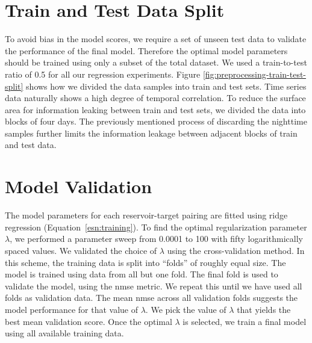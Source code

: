 \section{Train and Test Data Split} \label{sec:train-test-split}

To avoid bias in the model scores, we require a set of unseen test data to validate the performance of the final model.
Therefore the optimal model parameters should be trained using only a subset of the total dataset.
We used a train-to-test ratio of 0.5 for all our regression experiments.
Figure \ref{fig:preprocessing-train-test-split} shows how we divided the data samples into train and test sets.
Time series data naturally shows a high degree of temporal correlation.
To reduce the surface area for information leaking between train and test sets, we divided the data into blocks of four days.
The previously mentioned process of discarding the nighttime samples further limits the information leakage between adjacent blocks of train and test data.



\section{Model Validation} \label{methods:validation}

The model parameters for each reservoir-target pairing are fitted using ridge regression (\mbox{Equation \ref{esn:training}}).
To find the optimal regularization parameter $\lambda$, we performed a parameter sweep from 0.0001 to 100 with fifty logarithmically spaced values.
We validated the choice of $\lambda$ using the cross-validation method.
In this scheme, the training data is split into ``folds'' of roughly equal size. 
The model is trained using data from all but one fold.
The final fold is used to validate the model, using the \acrshort{nmse} metric.
We repeat this until we have used all folds as validation data.
The mean \acrshort{nmse} across all validation folds suggests the model performance for that value of $\lambda$.
We pick the value of $\lambda$ that yields the best mean validation score.
Once the optimal $\lambda$ is selected, we train a final model using all available training data.

